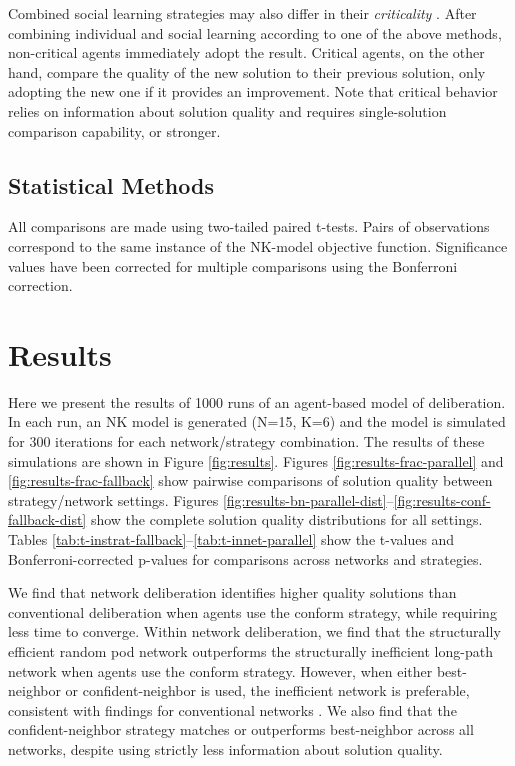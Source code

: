 Combined social learning strategies may also differ in their
{\em criticality} \cite{barkoczi_social_2016, rendell_rogersparadox_2010}.
After combining individual and social learning according to one of the above methods, non-critical agents immediately adopt the result.
Critical agents, on the other hand, compare the quality of the new solution to their previous solution, only adopting the new one if it provides an improvement.
Note that critical behavior relies on information about solution quality and requires single-solution comparison capability, or stronger.


\subsection{Statistical Methods}
All comparisons are made using two-tailed paired t-tests. Pairs of observations correspond to the same instance of the NK-model objective function.
Significance values have been corrected for multiple comparisons using the Bonferroni correction.

\section{Results}

Here we present the results of 1000 runs of an agent-based model of deliberation.
In each run, an NK model is generated (N=15, K=6) and the model is simulated for 300
iterations for each network/strategy combination.
The results of these simulations are shown in Figure \ref{fig:results}.
Figures \ref{fig:results-frac-parallel} and \ref{fig:results-frac-fallback} show pairwise comparisons of solution quality between strategy/network settings. Figures \ref{fig:results-bn-parallel-dist}--\ref{fig:results-conf-fallback-dist} show the complete solution quality distributions for all settings.
Tables \ref{tab:t-instrat-fallback}--\ref{tab:t-innet-parallel} show the t-values and Bonferroni-corrected p-values for comparisons across networks and strategies.

We find that network deliberation identifies higher quality solutions than
conventional deliberation when agents use the conform strategy,
while requiring less time to converge. Within network deliberation,
we find that the structurally efficient random pod network outperforms the
structurally inefficient long-path network when agents use the conform strategy.
However, when either best-neighbor or confident-neighbor is used,
the inefficient network is preferable, consistent with findings for conventional
networks \cite{barkoczi_social_2016}. We also find that the confident-neighbor
strategy matches or outperforms best-neighbor across all networks,
despite using strictly less information about solution quality.


